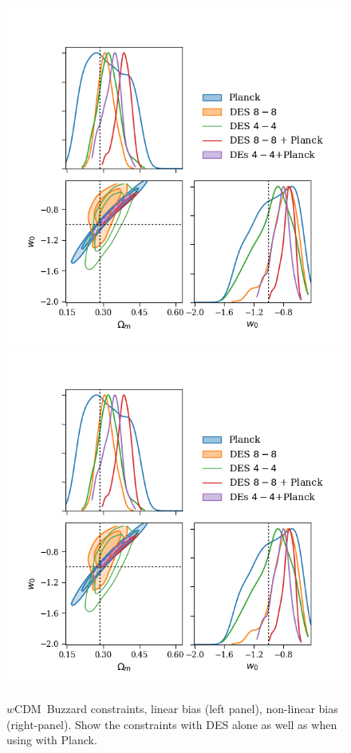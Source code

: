 \documentclass[fleqn,usenatbib]{mnras}
\newcommand{\wcdm}{$w$CDM}
\begin{document}
\begin{figure}
\includegraphics[width=\columnwidth]{figs/buzzard_wcdm_lin_om-w.png}
\includegraphics[width=\columnwidth]{figs/buzzard_wcdm_lin_om-w.png}
\caption[]{\wcdm\ Buzzard constraints, linear bias (left panel), non-linear bias (right-panel). Show the constraints with DES alone as well as when using with Planck.}
\label{fig:color_ims}
\end{figure}
\end{document}
